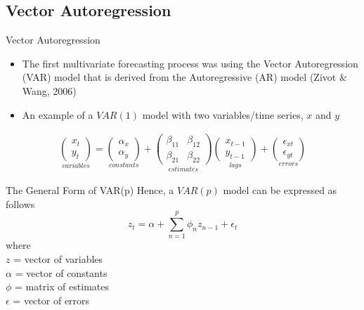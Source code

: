 \documentclass[aspectratio=169]{beamer}
\begin{document}
\subsection{Vector Autoregression}
\begin{frame}{Vector Autoregression}
    \begin{itemize}
        \item The first multivariate forecasting process was using the Vector Autoregression (VAR) model that is derived from the Autoregressive (AR) model (Zivot \& Wang, 2006)
        \item An example of a $VAR(1)$ model with two variables/time series, $x$ and $y$
    \end{itemize}
    \begin{gather}
            \underset{variables}{\begin{pmatrix} x_{t}  \\ y_{t} \end{pmatrix}}
            =
            \underset{constants}{\begin{pmatrix} \alpha_{x}  \\ \alpha_{y} \end{pmatrix}}
            +
            \underset{estimates}{\begin{pmatrix} \beta_{11} & \beta_{12}  \\ \beta_{21} & \beta_{22} \end{pmatrix}}
            \underset{lags}{\begin{pmatrix} x_{t-1} \\ y_{t-1} \end{pmatrix}}
            +
            \underset{errors}{\begin{pmatrix} \epsilon_{xt} \\ \epsilon_{yt} \end{pmatrix}}
    \end{gather}
\end{frame}

\begin{frame}{The General Form of VAR(p)}
Hence, a $VAR(p)$ model can be expressed as follows
    \begin{equation}
        z_{t} = \alpha + \sum_{n=1}^{p} \phi_{n}z_{n-1} + \epsilon_{t}
    \end{equation}
where\\
\hspace{1cm} $z$ = vector of variables\\
\hspace{1cm} $\alpha$ = vector of constants\\
\hspace{1cm} $\phi$ = matrix of estimates\\
\hspace{1cm} $\epsilon$ = vector of errors
\end{frame}
\end{document}
